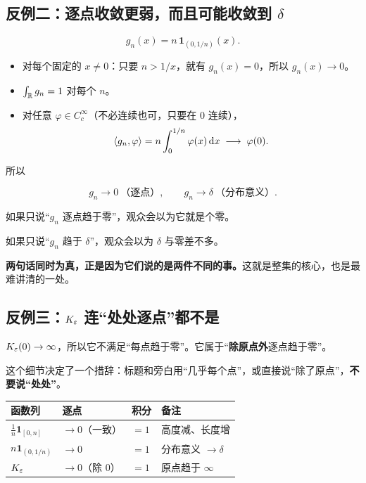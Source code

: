 \subsection{反例二：逐点收敛更弱，而且可能收敛到 $\delta$}

\begin{equation}
g_n(x)=n\,\mathbf{1}_{(0,1/n)}(x).
\end{equation}

\begin{itemize}[leftmargin=1.6em,itemsep=0.3em]
\item 对每个固定的 $x\neq0$：只要 $n>1/x$，就有 $g_n(x)=0$，所以 $g_n(x)\to0$。
\item $\int_{\mathbb{R}}g_n=1$ 对每个 $n$。
\item 对任意 $\varphi\in C_c^{\infty}$（不必连续也可，只要在 $0$ 连续），
\begin{equation}
\langle g_n,\varphi\rangle=n\int_{0}^{1/n}\varphi(x)\mathop{}\!\mathrm{d} x\;\longrightarrow\;\varphi(0).
\end{equation}
\end{itemize}

所以

\begin{equation}
g_n\to0\ \text{（逐点）},
\qquad
g_n\to\delta\ \text{（分布意义）}.
\end{equation}

\begin{warnbox}[这两句话必须一起说]
如果只说“$g_n$ 逐点趋于零”，观众会以为它就是个零。

如果只说“$g_n$ 趋于 $\delta$”，观众会以为 $\delta$ 与零差不多。

\textbf{两句话同时为真，正是因为它们说的是两件不同的事。}这就是整集的核心，也是最难讲清的一处。
\end{warnbox}

\subsection{反例三：$K_\varepsilon$ 连“处处逐点”都不是}

$K_\varepsilon(0)\to\infty$，所以它不满足“每点趋于零”。它属于“\textbf{除原点外}逐点趋于零”。

这个细节决定了一个措辞：标题和旁白用“几乎每个点”，或直接说“除了原点”，\textbf{不要说“处处”}。

\begin{center}
\small
\renewcommand{\arraystretch}{1.4}
\begin{tabularx}{\textwidth}{@{}L{3.6cm}L{2.6cm}L{2.6cm}Y@{}}
\toprule
函数列 & 逐点 & 积分 & 备注 \\
\midrule
$\frac1n\mathbf{1}_{[0,n]}$ & $\to0$（一致） & $=1$ & 高度减、长度增 \\
$n\mathbf{1}_{(0,1/n)}$ & $\to0$ & $=1$ & 分布意义 $\to\delta$ \\
$K_\varepsilon$ & $\to0$（除 $0$） & $=1$ & 原点趋于 $\infty$ \\
\bottomrule
\end{tabularx}
\end{center}

